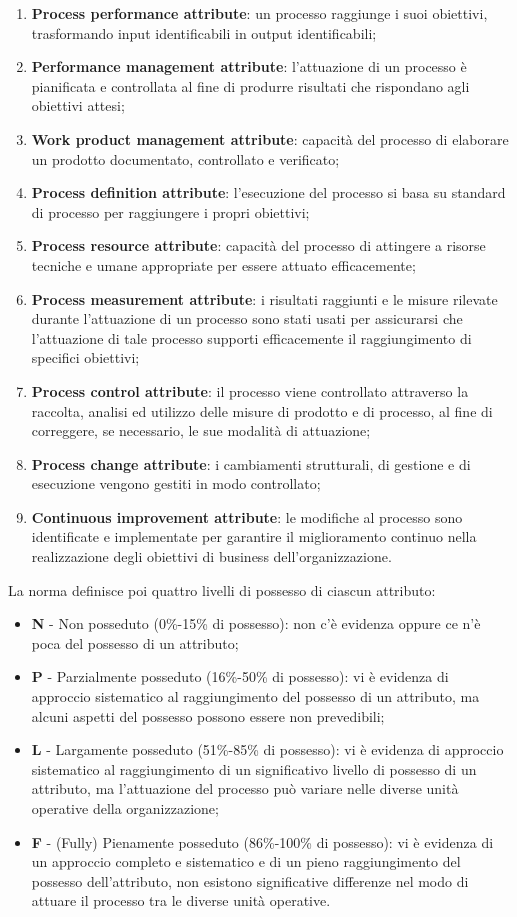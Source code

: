 \begin{enumerate}
    \item \textbf{Process performance attribute}: un processo raggiunge i suoi obiettivi, trasformando input identificabili in output identificabili;
    \item \textbf{Performance management attribute}: l'attuazione di un processo è pianificata e controllata al fine di produrre risultati che rispondano agli obiettivi attesi;
    \item \textbf{Work product management attribute}: capacità del processo di elaborare un prodotto documentato, controllato e verificato;
    \item \textbf{Process definition attribute}: l'esecuzione del processo si basa su standard di processo per raggiungere i propri obiettivi;
    \item \textbf{Process resource attribute}: capacità del processo di attingere a risorse tecniche e umane appropriate per essere attuato efficacemente;
    \item \textbf{Process measurement attribute}: i risultati raggiunti e le misure rilevate durante l'attuazione di un processo sono stati usati per assicurarsi che l'attuazione di tale processo supporti efficacemente il raggiungimento di specifici obiettivi;
    \item \textbf{Process control attribute}: il processo viene controllato attraverso la raccolta, analisi ed utilizzo delle misure di prodotto e di processo, al fine di correggere, se necessario, le sue modalità di attuazione;
    \item \textbf{Process change attribute}: i cambiamenti strutturali, di gestione e di esecuzione vengono gestiti in modo controllato;
    \item \textbf{Continuous improvement attribute}: le modifiche al processo sono identificate e implementate per garantire il miglioramento continuo nella realizzazione degli obiettivi di business dell'organizzazione.
\end{enumerate}
\smallskip
La norma definisce poi quattro livelli di possesso di ciascun attributo:
\smallskip
\begin{itemize}
	\item \textbf{N} - Non posseduto (0\%-15\% di possesso): non c'è evidenza oppure ce n'è poca del possesso di un attributo;
	\item \textbf{P} - Parzialmente posseduto (16\%-50\% di possesso): vi è evidenza di approccio sistematico al raggiungimento del possesso di un attributo, ma alcuni aspetti del possesso possono essere non prevedibili;
    \item \textbf{L} - Largamente posseduto (51\%-85\% di possesso): vi è evidenza di approccio sistematico al raggiungimento di un significativo livello di possesso di un attributo, ma l'attuazione del processo può variare nelle diverse unità operative della organizzazione;
	\item \textbf{F} - (Fully) Pienamente posseduto (86\%-100\% di possesso): vi è evidenza di un approccio completo e sistematico e di un pieno raggiungimento del possesso dell'attributo, non esistono significative differenze nel modo di attuare il processo tra le diverse unità operative.
\end{itemize}
